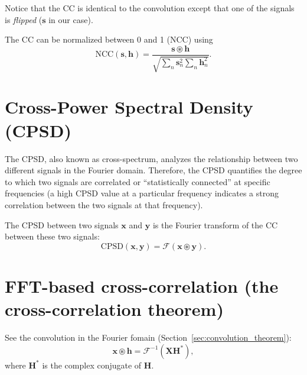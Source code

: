 Notice that the \gls{CC} is identical to the convolution except that
one of the signals is \emph{flipped} ($\mathbf{s}$ in our case).

The \gls{CC} can be normalized between 0 and 1 (\gls{NCC}) using
\begin{equation}
  \text{NCC}(\mathbf{s},\mathbf{h})=\frac{{\mathbf{s}\circledast\mathbf{h}}}{\sqrt{\sum_n \mathbf{s}_n^2 \sum_n \mathbf{h}_n^2}}.
\end{equation}


\section{Cross-Power Spectral Density (CPSD)}
\label{sec:CPSD}

The \gls{CPSD}, also known as cross-spectrum, analyzes the
relationship between two different signals in the Fourier
domain. Therefore, the \gls{CPSD} quantifies the degree to which two
signals are correlated or ``statistically connected'' at specific
frequencies (a high \gls{CPSD} value at a particular frequency
indicates a strong correlation between the two signals at that
frequency).

The \gls{CPSD} between two signals $\mathbf{x}$ and $\mathbf{y}$ is
the Fourier transform of the \gls{CC} between these two
signals:
\begin{equation}
  \text{CPSD}(\mathbf{x},\mathbf{y})=\mathcal{F}({\mathbf{x}\circledast\mathbf{y}}).
\end{equation}



\section{FFT-based cross-correlation (the cross-correlation theorem)}

See the convolution in the Fourier fomain (Section~\ref{sec:convolution_theorem}):
\begin{equation}
  \mathbf{x}\circledast\mathbf{h} = \mathcal{F}^{-1}(\mathbf{X}\mathbf{H}^*),
  \label{eq:FFT_CC}
\end{equation}
where $\mathbf{H}^*$ is the complex conjugate of $\mathbf{H}$.

